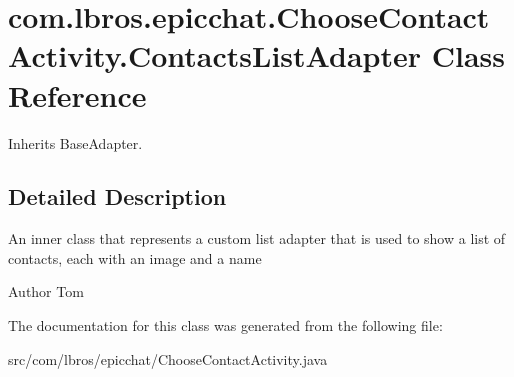 \hypertarget{classcom_1_1lbros_1_1epicchat_1_1_choose_contact_activity_1_1_contacts_list_adapter}{\section{com.\-lbros.\-epicchat.\-Choose\-Contact\-Activity.\-Contacts\-List\-Adapter Class Reference}
\label{classcom_1_1lbros_1_1epicchat_1_1_choose_contact_activity_1_1_contacts_list_adapter}
}


Inherits Base\-Adapter.



\subsection{Detailed Description}
An inner class that represents a custom list adapter that is used to show a list of contacts, each with an image and a name \begin{DoxyAuthor}{Author}
Tom 
\end{DoxyAuthor}


The documentation for this class was generated from the following file\-:\begin{DoxyCompactItemize}
\item 
src/com/lbros/epicchat/Choose\-Contact\-Activity.\-java\end{DoxyCompactItemize}
